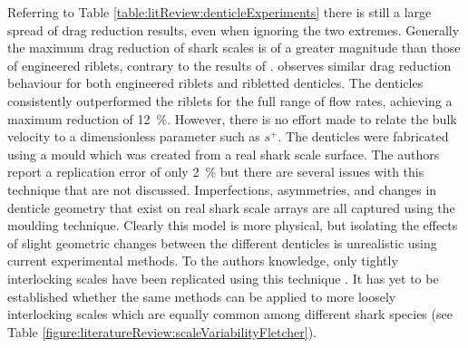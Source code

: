 \documentclass[12pt,oneside,a4paper]{article}
\begin{document}
Referring to Table \ref{table:litReview:denticleExperiments} there is still a large spread of drag reduction results, even when ignoring the two extremes. %
Generally the maximum drag reduction of shark scales is of a greater magnitude than those of engineered riblets, contrary to the results of \cite{bechert1985}. \cite{chen2014} observes similar drag reduction behaviour for both engineered riblets and ribletted denticles.
The denticles consistently outperformed the riblets for the full range of flow rates, achieving a maximum reduction of \SI{12}{\%}. However, there is no effort made to relate the bulk velocity to a dimensionless parameter such as $s^+$. The denticles were fabricated using a mould which was created from a real shark scale surface. The authors report a replication error of only \SI{2}{\%} but there are several issues with this technique that are not discussed. Imperfections, asymmetries, and changes in denticle geometry that exist on real shark scale arrays are all captured using the moulding technique. Clearly this model is more physical, but isolating the effects of slight geometric changes between the different denticles is unrealistic using current experimental methods. To the authors knowledge, only tightly interlocking scales have been replicated using this technique \citep{zhao2012, chen2014,zhang2011b,zhang2011a,luo2015b,luo2015}. It has yet to be established whether the same methods can be applied to more loosely interlocking scales which are equally common among different shark species (see Table \ref{figure:literatureReview:scaleVariabilityFletcher}).
\end{document}
